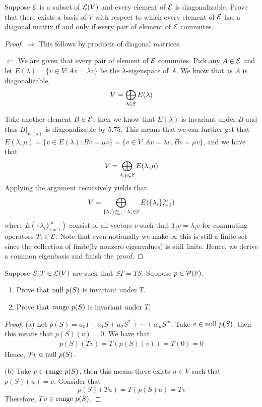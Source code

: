 \documentclass{extarticle}
\begin{document}
\newpage 
{}

\begin{problem}{2}
    Suppose \(\mathcal{E}\) is a subset of \(\mathcal{L}(V)\) and every element of \(\mathcal{E}\) is diagonalizable. Prove that 
    there exists a basis of \(V\) with respect to which every element of \(\mathcal{E}\) has a diagonal matrix 
    if and only if every pair of element of \(\mathcal{E}\) commutes.
\end{problem}

\begin{proof}
\(\Rightarrow\) This follows by products of diagonal matrices.

\(\Leftarrow\) We are given that every pair of element of \(\mathcal{E}\) commutes. Pick any \(A \in \mathcal{E}\) and 
let \(E(\lambda) = \{v \in V \colon Av = \lambda v\}\) be the \(\lambda\)-eigenspace of \(A\). We know 
that as \(A\) is diagonalizable, 
\[V = \bigoplus_{\lambda \in \mathbb{F}} E(\lambda)\] 

Take another element \(B \in \mathcal{E}\), then we know that \(E(\lambda)\) is invariant under \(B\) and thus 
\(B|_{E(\lambda)}\) is diagonalizable by 5.75. This means that we can further get that \(E(\lambda, \mu) 
= \{v \in E(\lambda) \colon Bv = \mu v\} = \{v \in V \colon Av=\lambda v, Bv = \mu v\}\), and we have that 
\[V = \bigoplus_{\lambda, \mu \in \mathbb{F}} E(\lambda, \mu)\]
Applying the argument recursively yields that 
\[V = \bigoplus_{\{\lambda_i\}_{i=1}^\infty \colon \lambda_i \in \mathbb{F}} E(\{\lambda_i\}_{i=1}^\infty) \]
where \(E(\{\lambda_i\}_{i=1}^\infty)\) consist of all vectors \(v\) such that 
\(T_i v = \lambda_i v\) for commuting operators \(T_i \in \mathcal{E}\). Note that even notionally we make 
\(\infty\) this is still a finite set since the collection of finite(ly nonzero eigenvalues) is still 
finite. Hence, we derive a common eigenbasis and finish the proof.
\end{proof}

\begin{problem}{3}
    Suppose \(S, T \in \mathcal{L}(V)\) are such that \(ST = TS\). Suppose \(p \in \mathcal{P}(\mathbb{F})\). 
    \begin{enumerate}[label=(\alph*)]
        \item Prove that \(\text{null } p(S)\) is invariant under \(T\). 
        \item Prove that \(\text{range } p(S)\) is invariant under \(T\).
    \end{enumerate}
\end{problem}

\begin{proof}
(a) Let \(p(S) = a_0I + a_1 S + a_2 S^2 + \cdots + a_m S^m\). Take \(v \in \text{null } p(S)\), then this means that 
\(p(S)(v) = 0\). We have that 
\begin{align*}
    p(S)(Tv) = T(p(S)(v)) = T(0) = 0 
\end{align*}
Hence, \(Tv \in \text{null } p(S)\). 

(b) Take \(v \in \text{range } p(S)\), then this means there exists \(u \in V\) such that \(p(S)(u) = v\). Consider that 
\[p(S)(Tu) = T(p(S)u) = Tv\]
Therefore, \(Tv \in \text{range } p(S)\).
\end{proof}
\end{document}
